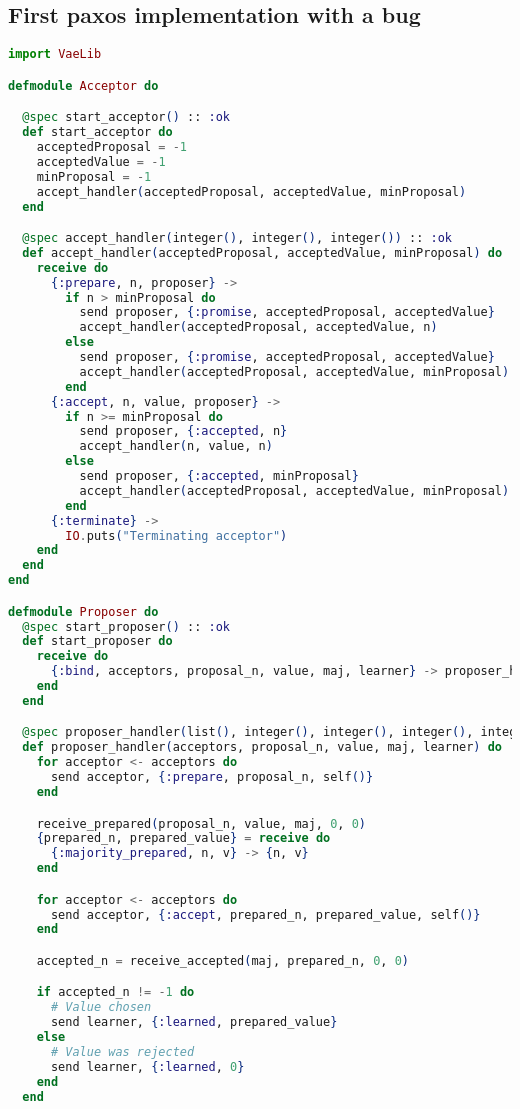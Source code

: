 \subsection{First paxos implementation with a bug}
\begin{lstlisting}[language=Elixir, xleftmargin=.1\linewidth]
import VaeLib

defmodule Acceptor do

  @spec start_acceptor() :: :ok
  def start_acceptor do
    acceptedProposal = -1
    acceptedValue = -1
    minProposal = -1
    accept_handler(acceptedProposal, acceptedValue, minProposal)
  end

  @spec accept_handler(integer(), integer(), integer()) :: :ok
  def accept_handler(acceptedProposal, acceptedValue, minProposal) do
    receive do
      {:prepare, n, proposer} ->
        if n > minProposal do
          send proposer, {:promise, acceptedProposal, acceptedValue}
          accept_handler(acceptedProposal, acceptedValue, n)
        else
          send proposer, {:promise, acceptedProposal, acceptedValue}
          accept_handler(acceptedProposal, acceptedValue, minProposal)
        end
      {:accept, n, value, proposer} ->
        if n >= minProposal do
          send proposer, {:accepted, n}
          accept_handler(n, value, n)
        else
          send proposer, {:accepted, minProposal}
          accept_handler(acceptedProposal, acceptedValue, minProposal)
        end
      {:terminate} ->
        IO.puts("Terminating acceptor")
    end
  end
end

defmodule Proposer do
  @spec start_proposer() :: :ok
  def start_proposer do
    receive do
      {:bind, acceptors, proposal_n, value, maj, learner} -> proposer_handler(acceptors, proposal_n, value, maj, learner)
    end
  end

  @spec proposer_handler(list(), integer(), integer(), integer(), integer()) :: :ok
  def proposer_handler(acceptors, proposal_n, value, maj, learner) do
    for acceptor <- acceptors do
      send acceptor, {:prepare, proposal_n, self()}
    end

    receive_prepared(proposal_n, value, maj, 0, 0)
    {prepared_n, prepared_value} = receive do
      {:majority_prepared, n, v} -> {n, v}
    end

    for acceptor <- acceptors do
      send acceptor, {:accept, prepared_n, prepared_value, self()}
    end

    accepted_n = receive_accepted(maj, prepared_n, 0, 0)

    if accepted_n != -1 do
      # Value chosen
      send learner, {:learned, prepared_value}
    else
      # Value was rejected
      send learner, {:learned, 0}
    end
  end


\end{lstlisting}
